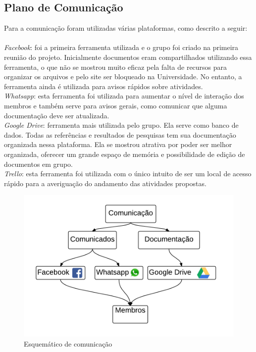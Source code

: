 \subsection{Plano de Comunica\c{c}\~ao}

Para a comunica\c{c}\~ao foram utilizadas v\'arias plataformas, como descrito a seguir:
\\ \\ \textit {Facebook}: foi a primeira ferramenta utilizada e o grupo foi criado na primeira reuni\~ao do projeto. Inicialmente documentos eram compartilhados utilizando essa ferramenta, o que n\~ao se mostrou muito eficaz pela falta de recursos para organizar os arquivos e pelo site ser bloqueado na Universidade. No entanto, a ferramenta ainda \'e utilizada para avisos r\'apidos sobre atividades. 
\\ \textit{Whatsapp}: esta ferramenta foi utilizada para aumentar o n\'ivel de intera\c{c}\~ao dos membros e tamb\'em serve para avisos gerais, como comunicar que alguma documenta\c{c}\~ao deve ser atualizada.
\\ \textit{Google Drive}: ferramenta mais utilizada pelo grupo. Ela serve como banco de dados. Todas as refer\^encias e resultados de pesquisas tem sua documenta\c{c}\~ao organizada nessa plataforma. Ela se mostrou atrativa por poder ser melhor organizada, oferecer um grande espa\c{c}o de mem\'oria e possibilidade de edi\c{c}\~ao de documentos em grupo.
\\ \textit{Trello}: esta ferramenta foi utilizada com o \'unico intuito de ser um local de acesso r\'apido para a averigua\c{c}\~ao do andamento das atividades propostas.

\begin{figure}[h]
	\centering
	\label{comunicacao}
		\includegraphics[keepaspectratio=true,scale=0.7]{figuras/comunicacao.png}
	\caption{Esquem\'atico de comunica\c{c}\~ao}
\end{figure}

